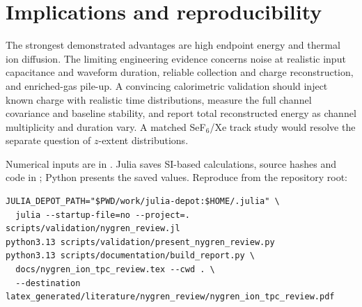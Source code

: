 \documentclass[11pt,a4paper]{article}
\begin{document}
\section{Implications and reproducibility}
The strongest demonstrated advantages are high endpoint energy and thermal
ion diffusion. The limiting engineering evidence concerns noise at realistic
input capacitance and waveform duration, reliable collection and charge
reconstruction, and enriched-gas pile-up. A convincing calorimetric validation
should inject known charge with realistic time distributions, measure the
full channel covariance and baseline stability, and report total reconstructed
energy as channel multiplicity and duration vary. A matched SeF$_6$/Xe track
study would resolve the separate question of $z$-extent distributions.

Numerical inputs are in . Julia saves SI-based
calculations, source hashes and code in ;
Python presents the saved values. Reproduce from the repository root:
\begin{verbatim}
JULIA_DEPOT_PATH="$PWD/work/julia-depot:$HOME/.julia" \
  julia --startup-file=no --project=. scripts/validation/nygren_review.jl
python3.13 scripts/validation/present_nygren_review.py
python3.13 scripts/documentation/build_report.py \
  docs/nygren_ion_tpc_review.tex --cwd . \
  --destination latex_generated/literature/nygren_review/nygren_ion_tpc_review.pdf
\end{verbatim}


\end{document}

